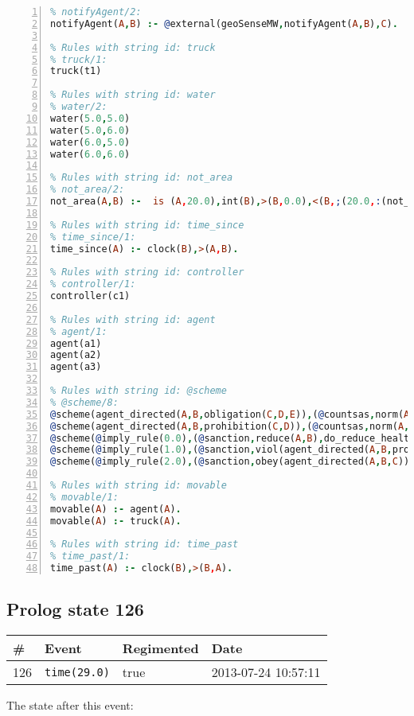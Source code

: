 \documentclass[11pt]{article}\usepackage[utf8]{inputenc}\usepackage{geometry}
\begin{document}
\begin{lstlisting}[language=Prolog, numbers=left]
% Rules with string id: notifyAgent
% notifyAgent/2:
notifyAgent(A,B) :- @external(geoSenseMW,notifyAgent(A,B),C).

% Rules with string id: truck
% truck/1:
truck(t1)

% Rules with string id: water
% water/2:
water(5.0,5.0)
water(5.0,6.0)
water(6.0,5.0)
water(6.0,6.0)

% Rules with string id: not_area
% not_area/2:
not_area(A,B) :-  is (A,20.0),int(B),>(B,0.0),<(B,;(20.0,:(not_area(A,B), is (-(B),20.0)))),int(A),>(A,0.0),<(A,;(20.0,:(area(A,B),-(int(A))))),int(B),>(A,0.0),>(B,0.0),<(A,21.0),<(B,21.0).

% Rules with string id: time_since
% time_since/1:
time_since(A) :- clock(B),>(A,B).

% Rules with string id: controller
% controller/1:
controller(c1)

% Rules with string id: agent
% agent/1:
agent(a1)
agent(a2)
agent(a3)

% Rules with string id: @scheme
% @scheme/8:
@scheme(agent_directed(A,B,obligation(C,D,E)),(@countsas,norm(A,B,F,obligation(C,D,E)),F),false,(listTrue(C)),(time_past(D)),false,[plus(viol(agent_directed(A,B,obligation(C,D,E))))|[]],[plus(obey(agent_directed(A,B,obligation(C,D,E))))|[]])
@scheme(agent_directed(A,B,prohibition(C,D)),(@countsas,norm(A,B,E,prohibition(C,D)),E),(listTrue(C)),false,(false),false,[plus(viol(agent_directed(A,B,prohibition(C,D))))|[]],[plus(obey(agent_directed(A,B,prohibition(C,D))))|[]])
@scheme(@imply_rule(0.0),(@sanction,reduce(A,B),do_reduce_health(A,B),notifyAgent(A,changed(status))),true,false,false,false,[min(reduce(A,B))|[]],[])
@scheme(@imply_rule(1.0),(@sanction,viol(agent_directed(A,B,prohibition(C,D))),do_sanction(D)),true,false,false,false,[min(viol(agent_directed(A,B,prohibition(C,D))))|[]],[])
@scheme(@imply_rule(2.0),(@sanction,obey(agent_directed(A,B,C))),true,false,false,false,[min(obey(agent_directed(A,B,C)))|[]],[])

% Rules with string id: movable
% movable/1:
movable(A) :- agent(A).
movable(A) :- truck(A).

% Rules with string id: time_past
% time_past/1:
time_past(A) :- clock(B),>(B,A).

\end{lstlisting}
\clearpage 
\subsection{Prolog state 126}
\begin{table}[ht]
\centering 
\begin{tabular}{l l l l} 
\textbf{\#} & \textbf{Event} & \textbf{Regimented} & \textbf{Date} \\ [0.5ex] 
\hline
126&\texttt{time(29.0)}&true&2013-07-24 10:57:11\\ [1ex] \hline\end{tabular}
\end{table}
The state after this event:
\end{document}
